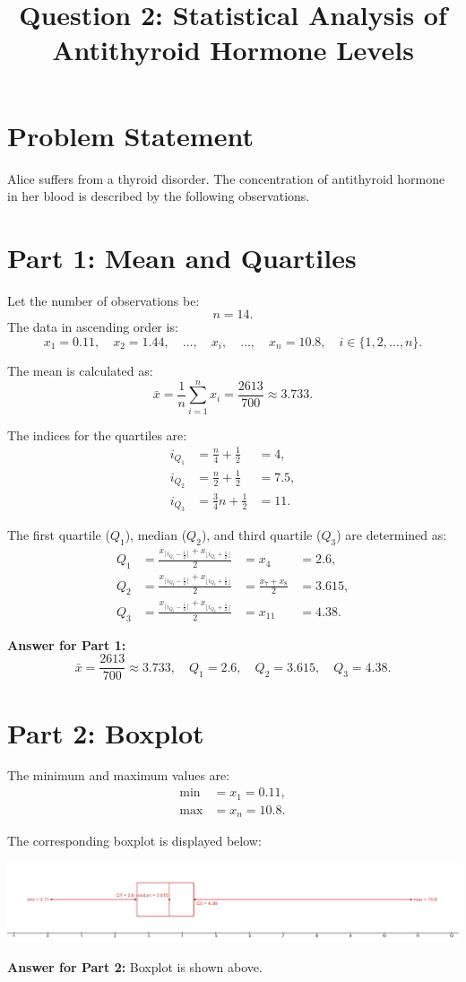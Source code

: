 \documentclass[12pt]{article}
\title{Question 2: Statistical Analysis of Antithyroid Hormone Levels}
\author{}
\date{}
\begin{document}
\maketitle
\onehalfspacing

\section*{Problem Statement}
Alice suffers from a thyroid disorder. The concentration of antithyroid hormone in her blood is described by the following observations.

\bigskip

\section*{Part 1: Mean and Quartiles}
Let the number of observations be:
\[
n = 14.
\]
The data in ascending order is:
\[
x_1 = 0.11, \quad x_2 = 1.44, \quad \dots, \quad x_i, \quad \dots, \quad x_n = 10.8, \quad i \in \{1,2,\dots,n\}.
\]

The mean is calculated as:
\[
\bar{x} = \frac{1}{n} \sum_{i=1}^{n} x_i = \frac{2613}{700} \approx 3.733.
\]

The indices for the quartiles are:
\[
\begin{alignedat}{2}
i_{Q_1} &= \frac{n}{4}+\frac{1}{2} &= 4, \\
i_{Q_2} &= \frac{n}{2}+\frac{1}{2} &= 7.5, \\
i_{Q_3} &= \frac{3}{4}n+\frac{1}{2} &= 11.
\end{alignedat}
\]

The first quartile ($Q_1$), median ($Q_2$), and third quartile ($Q_3$) are determined as:
\[
\begin{alignedat}{3}
Q_1 &= \frac{x_{\lceil i_{Q_1}-\frac{1}{2} \rceil} + x_{\lfloor i_{Q_1}+\frac{1}{2} \rfloor}}{2} &= x_4 &= 2.6, \\
Q_2 &= \frac{x_{\lceil i_{Q_2}-\frac{1}{2} \rceil} + x_{\lfloor i_{Q_2}+\frac{1}{2} \rfloor}}{2} &= \frac{x_7 + x_8}{2} &= 3.615, \\
Q_3 &= \frac{x_{\lceil i_{Q_3}-\frac{1}{2} \rceil} + x_{\lfloor i_{Q_3}+\frac{1}{2} \rfloor}}{2} &= x_{11} &= 4.38.
\end{alignedat}
\]

\textbf{Answer for Part 1:}
\[
\bar{x} = \frac{2613}{700} \approx 3.733, \quad Q_1 = 2.6, \quad Q_2 = 3.615, \quad Q_3 = 4.38.
\]

\bigskip

\section*{Part 2: Boxplot}
The minimum and maximum values are:
\[
\begin{aligned}
\text{min} &= x_1 = 0.11, \\
\text{max} &= x_n = 10.8.
\end{aligned}
\]

The corresponding boxplot is displayed below:

\begin{center}
    \includegraphics[width=1\textwidth]{Q2-P2-boxplot.png}
\end{center}

\textbf{Answer for Part 2:} Boxplot is shown above.
\end{document}
